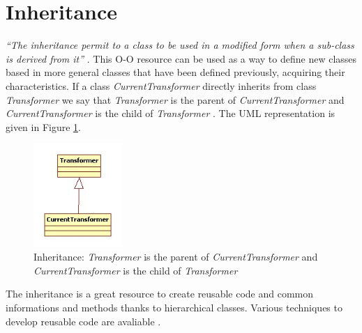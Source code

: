 \section{Inheritance}

\emph{
	``The inheritance permit to a class to be 
	used in a modified form when a sub-class 
	is derived from it''
} \cite{Capretz:2003}. This O-O resource 
can be used as a way to define new
classes based in more general classes that have been 
defined previously, acquiring their characteristics.  
If a class \emph{CurrentTransformer} directly 
inherits from class \emph{Transformer} we say that 
\emph{Transformer} is the parent 
of \emph{CurrentTransformer} and 
\emph{CurrentTransformer} is the 
child of \emph{Transformer} \cite{Snyder:1986}. 
The UML representation is given in 
Figure \ref{fig:inheritance-fig}.

\begin{figure}
  \includegraphics[width=0.3\textwidth]{chapters/ch-oop/figures/inheritance}
  \caption{
  		Inheritance: \emph{Transformer} is the parent 
		of \emph{CurrentTransformer} and 
		\emph{CurrentTransformer} is the 
		child of \emph{Transformer}
		}
  \label{fig:inheritance-fig}
\end{figure}

The inheritance is a great resource to create 
reusable code and common informations and methods 
thanks to hierarchical classes. 
Various techniques to develop reusable code are 
avaliable 
\cite{Johnson:1988} 
\cite{Micallef:1988}
\cite{Gossain:1990} 
\cite{Capretz:1992}.  
